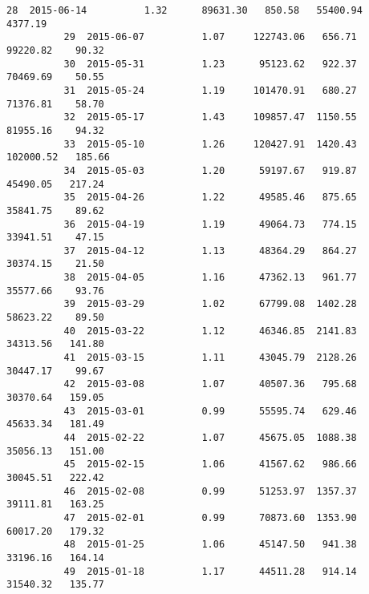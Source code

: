 \documentclass[11pt]{article}
\begin{document}
\begin{Verbatim}[commandchars=\\\{\}]
          28  2015-06-14          1.32      89631.30   850.58   55400.94  4377.19   
          29  2015-06-07          1.07     122743.06   656.71   99220.82    90.32   
          30  2015-05-31          1.23      95123.62   922.37   70469.69    50.55   
          31  2015-05-24          1.19     101470.91   680.27   71376.81    58.70   
          32  2015-05-17          1.43     109857.47  1150.55   81955.16    94.32   
          33  2015-05-10          1.26     120427.91  1420.43  102000.52   185.66   
          34  2015-05-03          1.20      59197.67   919.87   45490.05   217.24   
          35  2015-04-26          1.22      49585.46   875.65   35841.75    89.62   
          36  2015-04-19          1.19      49064.73   774.15   33941.51    47.15   
          37  2015-04-12          1.13      48364.29   864.27   30374.15    21.50   
          38  2015-04-05          1.16      47362.13   961.77   35577.66    93.76   
          39  2015-03-29          1.02      67799.08  1402.28   58623.22    89.50   
          40  2015-03-22          1.12      46346.85  2141.83   34313.56   141.80   
          41  2015-03-15          1.11      43045.79  2128.26   30447.17    99.67   
          42  2015-03-08          1.07      40507.36   795.68   30370.64   159.05   
          43  2015-03-01          0.99      55595.74   629.46   45633.34   181.49   
          44  2015-02-22          1.07      45675.05  1088.38   35056.13   151.00   
          45  2015-02-15          1.06      41567.62   986.66   30045.51   222.42   
          46  2015-02-08          0.99      51253.97  1357.37   39111.81   163.25   
          47  2015-02-01          0.99      70873.60  1353.90   60017.20   179.32   
          48  2015-01-25          1.06      45147.50   941.38   33196.16   164.14   
          49  2015-01-18          1.17      44511.28   914.14   31540.32   135.77   
          

\end{Verbatim}
\end{document}
